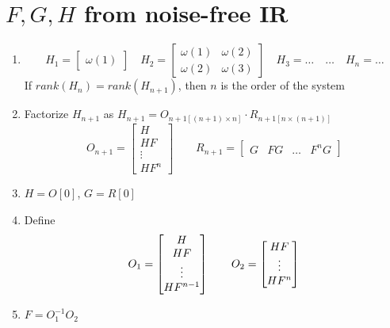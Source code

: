 \documentclass{article}
\begin{document}
\section{$F,G,H$ from noise-free IR}
\begin{enumerate}
\item
	\[
	H_1=\begin{bmatrix}
	\omega(1)
	\end{bmatrix}
	\quad
	H_2=\begin{bmatrix}
	\omega(1)&\omega(2)\\
	\omega(2)&\omega(3)
	\end{bmatrix}
	\quad
	H_3=\dots
	\quad
	\dots
	\quad
	H_n=\dots
	\]
	If $rank(H_n)=rank(H_{n+1})$, then $n$ is the order of the system 
\item Factorize $H_{n+1}$ as $H_{n+1}=O_{n+1[(n+1)\times n]}\cdot R_{n+1[n\times(n+1)]}$
	\[
	O_{n+1}=\begin{bmatrix}
	H\\HF\\\vdots\\HF^n
	\end{bmatrix}
	\qquad
	R_{n+1}=\begin{bmatrix}
	G&FG&\dots&F^nG
	\end{bmatrix}
	\]
\item $H=O[0]$, $G=R[0]$
\item Define\[
	O_1=\begin{bmatrix}
	H\\HF\\\vdots\\HF^{n-1}
	\end{bmatrix}
	\qquad
	O_2=\begin{bmatrix}
	HF\\\vdots\\HF^n
	\end{bmatrix}\\
	\]
\item $F=O_1^{-1}O_2$
\end{enumerate}
\end{document}
